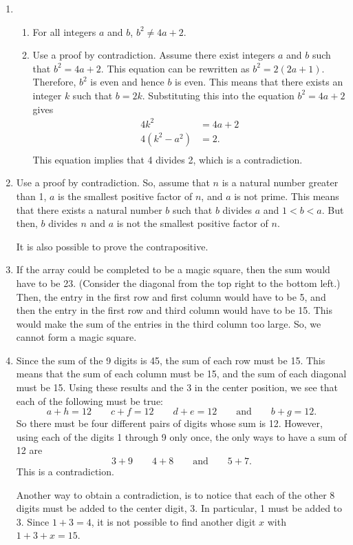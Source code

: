 \begin{enumerate}
\item \begin{enumerate}
\item For all integers $a$ and $b$, $b^2 \ne 4a + 2$.

\item  Use a proof by contradiction.  Assume there exist integers $a$ and $b$ such that 
$b^2 = 4a + 2$.  This equation can be rewritten as $b^2 = 2 \left( 2a + 1 \right)$.  Therefore, $b^2$ is even and hence $b$ is even.  This means that there exists an integer $k$ such that 
$b = 2k$.  Substituting this into the equation $b^2 = 4a + 2$ gives
\[
\begin{aligned}
4k^2 &= 4a + 2 \\
4 \left( k^2 - a^2 \right) &= 2. \\
\end{aligned}
\]
This equation implies that 4 divides 2, which is a contradiction.
\end{enumerate}


\item Use a proof by contradiction.  So, assume that $n$ is a natural number greater than 1, $a$ is the smallest positive factor of $n$, and $a$ is not prime.  This means that there exists a natural number $b$ such that $b$ divides $a$ and $1 < b < a$.  But then, $b$ divides $n$ and $a$ is not the smallest positive factor of $n$.

It is also possible to prove the contrapositive.



\item If the array could be completed to be a magic square, then the sum would have to be 23.  (Consider the diagonal from the top right to the bottom left.)  Then, the entry in the first row and first column would have to be 5, and then the entry in the first row and third column would have to be 15.  This would make the sum of the entries in the third column too large.  So, we cannot form a magic square.


\item Since the sum of the 9 digits is 45, the sum of each row must be 15.  This means that the sum of each column must be 15, and the sum of each diagonal must be 15.  Using these results and the 3 in the center position, we see that each of the following must be true:
\[
a + h = 12 \qquad c + f = 12 \qquad d + e = 12 \qquad \text{and} \qquad b + g = 12.
\]
So there must be four different pairs of digits whose sum is 12.  However, using each of the digits 1 through 9 only once, the only ways to have a sum of 12 are
\[
3 + 9 \qquad 4 + 8 \qquad \text{and} \qquad 5 + 7.
\]
This is a contradiction.

\newpar
Another way to obtain a contradiction, is to notice that each of the other 8 digits must be added to the center digit, 3.  In particular, 1 must be added to 3.  Since $1 + 3 = 4$, it is not possible to find another digit $x$ with $1 + 3 + x = 15$.
\end{enumerate}



